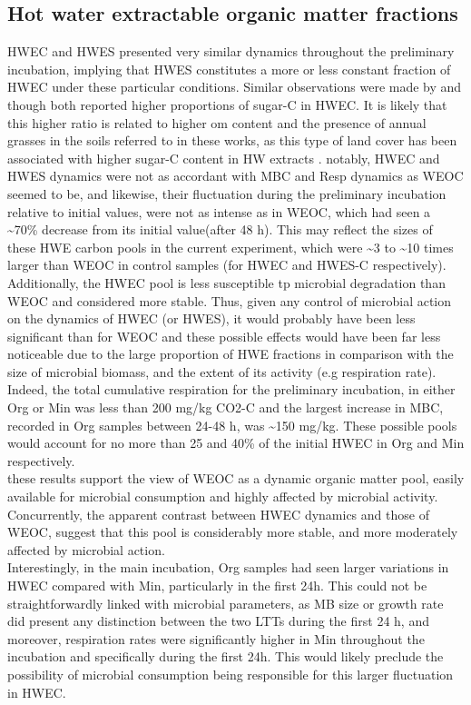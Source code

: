 	\subsection{Hot water extractable organic matter fractions}
	HWEC and HWES presented very similar dynamics throughout the preliminary incubation, implying that HWES constitutes  a more or less constant fraction of HWEC under these particular conditions. Similar observations were made by \citet{haynes2005} and \citet{ghani2000, ghani2003} though both reported higher proportions of sugar-C in HWEC. It is likely that this higher ratio is related to higher \gls{om} content and the presence of annual grasses in the soils referred to in these works, as this type of land cover has been associated with higher sugar-C content in HW extracts \citep{haynes1993}.
	notably, HWEC and HWES dynamics were not as accordant with MBC and Resp dynamics as WEOC seemed to be, and likewise, their fluctuation during the preliminary incubation relative to initial values, were not as intense as in WEOC, which had seen a \~{}70\% decrease from its initial value(after 48 h). This may reflect the sizes of these HWE carbon pools in the current experiment, which were \~{}3 to \~{}10 times larger than WEOC in control samples (for HWEC and HWES-C respectively). Additionally, the HWEC pool is less susceptible tp microbial degradation than WEOC and  considered more stable. Thus, given any control of microbial action on the dynamics of HWEC (or HWES), it would probably have been less significant than for WEOC and these possible effects would have been far less noticeable due to the large proportion of HWE fractions in comparison with the size of microbial biomass, and the extent of its activity (e.g respiration rate). Indeed, the total cumulative respiration  for the preliminary incubation, in either Org or Min was less than 200 mg/kg CO2-C and the largest increase in MBC, recorded in Org samples between 24-48 h, was \~{}150 mg/kg. These possible pools would account for no more than 25 and 40\% of the initial HWEC in Org and Min respectively. \\
	these results support the view of WEOC as a dynamic organic matter pool, easily available for microbial consumption and highly affected by microbial activity. Concurrently, the apparent contrast between HWEC dynamics and those of WEOC, suggest that this pool is considerably more stable, and more moderately affected by microbial action.\\
	Interestingly, in the main incubation, Org samples had seen larger variations in HWEC compared with Min, particularly in the first 24h. This could not be straightforwardly linked with microbial parameters, as MB size or growth rate did present any distinction between the two LTTs during the first 24 h, and moreover, respiration rates were significantly higher in Min throughout the incubation and specifically during the first 24h. This would likely preclude the possibility of microbial consumption being responsible for this larger fluctuation in HWEC.\\
